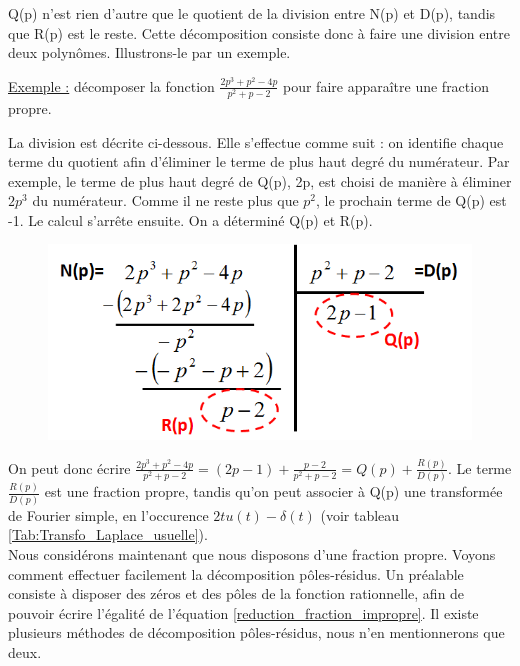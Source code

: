 	 Q(p) n'est rien d'autre que le quotient de la division entre N(p) et D(p), tandis que R(p) est le reste. Cette décomposition consiste donc à faire une division entre deux polynômes. Illustrons-le par un exemple.
	 
	 \vspace{0.5\baselineskip}
	 \underline{Exemple :} décomposer la fonction $\frac{2p^{3}+p^{2}-4p}{p^{2}+p-2}$ pour faire apparaître une fraction propre.
	 
	 La division est décrite ci-dessous. Elle s'effectue comme suit : on identifie chaque terme du quotient afin d'éliminer le terme de plus haut degré du numérateur. Par exemple, le terme de plus haut degré de Q(p), 2p, est choisi de manière à éliminer $2p^{3}$ du numérateur. Comme il ne reste plus que $p^{2}$, le prochain terme de Q(p) est -1. Le calcul s'arrête ensuite. On a déterminé Q(p) et R(p).
	 
	 \begin{figure}[h!]
	 	\centering
	 	\includegraphics[scale=0.5]{images/ex_fraction_impropre.png} 
	 \end{figure}
 	
 	On peut donc écrire $\frac{2p^{3}+p^{2}-4p}{p^{2}+p-2}=(2p-1)+\frac{p-2}{p^{2}+p-2}=Q(p)+\frac{R(p)}{D(p)}$. Le terme $\frac{R(p)}{D(p)}$ est une fraction propre, tandis qu'on peut associer à Q(p) une transformée de Fourier simple, en l'occurence $2tu(t)-\delta(t)$ (voir tableau \ref{Tab:Transfo_Laplace_usuelle}). \\
	
	
	Nous considérons maintenant que nous disposons d'une fraction propre. Voyons comment effectuer facilement la décomposition pôles-résidus. Un préalable consiste à disposer des zéros et des pôles de la fonction rationnelle, afin de pouvoir écrire l'égalité de l'équation \ref{reduction_fraction_impropre}. Il existe plusieurs méthodes de décomposition pôles-résidus, nous n'en mentionnerons que deux. 
	
